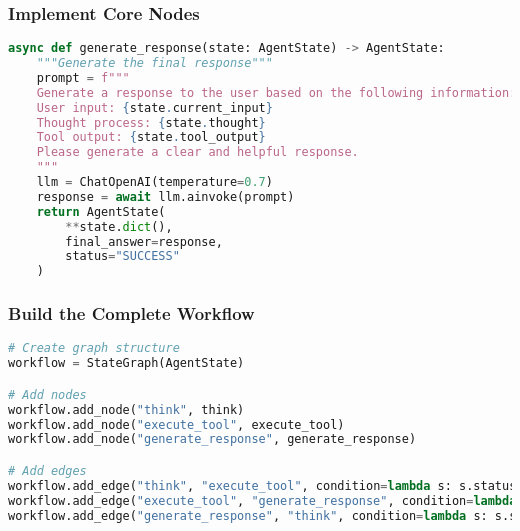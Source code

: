 \begin{frame}[fragile]\frametitle{Implement Core Nodes}
\begin{lstlisting}[language=Python, basicstyle=\tiny]
async def generate_response(state: AgentState) -> AgentState:
    """Generate the final response"""
    prompt = f"""
    Generate a response to the user based on the following information:
    User input: {state.current_input}
    Thought process: {state.thought}
    Tool output: {state.tool_output}
    Please generate a clear and helpful response.
    """
    llm = ChatOpenAI(temperature=0.7)
    response = await llm.ainvoke(prompt)
    return AgentState(
        **state.dict(),
        final_answer=response,
        status="SUCCESS"
    )
\end{lstlisting}

\end{frame}

\begin{frame}[fragile]\frametitle{Build the Complete Workflow}
\begin{lstlisting}[language=Python, basicstyle=\tiny]
# Create graph structure
workflow = StateGraph(AgentState)

# Add nodes
workflow.add_node("think", think)
workflow.add_node("execute_tool", execute_tool)
workflow.add_node("generate_response", generate_response)

# Add edges
workflow.add_edge("think", "execute_tool", condition=lambda s: s.status == "NEED_TOOL")
workflow.add_edge("execute_tool", "generate_response", condition=lambda s: s.status == "GENERATE_RESPONSE")
workflow.add_edge("generate_response", "think", condition=lambda s: s.status == "SUCCESS")
\end{lstlisting}

\end{frame}
